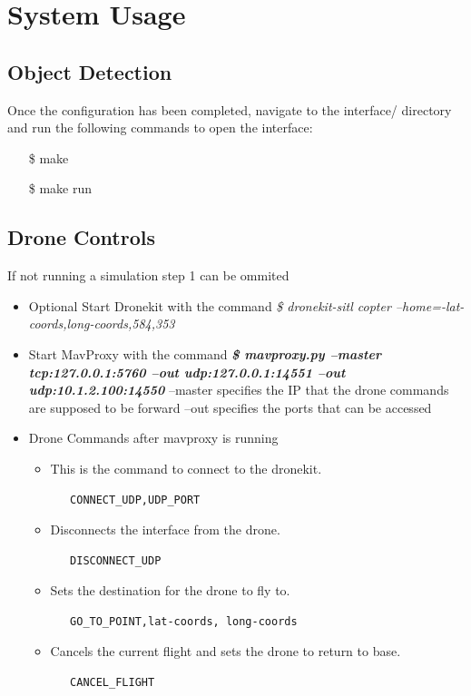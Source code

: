 \chapter{System Usage}
\section{Object Detection}

Once the configuration has been completed, navigate to the interface/ directory and run the following commands to open the interface:
\begin{itemize}
    \item[\$] make
    \item[\$] make run
\end{itemize}

\section{Drone Controls}
If not running a simulation step 1 can be ommited
\begin{itemize}
    \item {Optional} Start Dronekit with the command 
        \newline\textit{\$ dronekit-sitl copter --home=-lat-coords,long-coords,584,353}
    \item Start MavProxy with the command 
        \newline \textbf{\textit{\$ mavproxy.py --master tcp:127.0.0.1:5760 --out udp:127.0.0.1:14551 --out udp:10.1.2.100:14550}}
        \newline --master specifies the IP that the drone commands are supposed to be forward
        \newline --out specifies the ports that can be accessed 
    \item Drone Commands after mavproxy is running
    \begin{itemize}
        \item This is the command to connect to the dronekit.
        \item [] \begin{verbatim}   CONNECT_UDP,UDP_PORT\end{verbatim} 
        \item Disconnects the interface from the drone.
        \item [] \begin{verbatim}   DISCONNECT_UDP\end{verbatim}
        \item Sets the destination for the drone to fly to.
        \item [] \begin{verbatim}   GO_TO_POINT,lat-coords, long-coords\end{verbatim}
        \item Cancels the current flight and sets the drone to return to base.
        \item [] \begin{verbatim}   CANCEL_FLIGHT\end{verbatim}
     \end{itemize}
\end{itemize}


